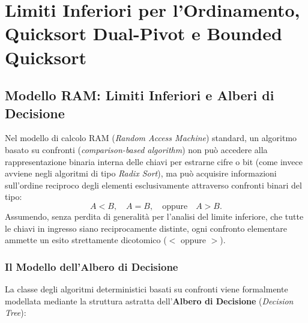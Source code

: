 \chapter{Limiti Inferiori per l'Ordinamento, Quicksort Dual-Pivot e Bounded Quicksort}
\label{cha:lecture-five}

\FloatBarrier
\section{Modello RAM: Limiti Inferiori e Alberi di Decisione}
\label{sec:ram-lower-bounds}

Nel modello di calcolo RAM (\textit{Random Access Machine}) standard, un algoritmo basato su confronti (\textit{comparison-based algorithm}) non può accedere alla rappresentazione binaria interna delle chiavi per estrarne cifre o bit (come invece avviene negli algoritmi di tipo \textit{Radix Sort}), ma può acquisire informazioni sull'ordine reciproco degli elementi esclusivamente attraverso confronti binari del tipo:
\begin{equation}
  A < B, \quad A = B, \quad \text{oppure} \quad A > B.
\end{equation}
Assumendo, senza perdita di generalità per l'analisi del limite inferiore, che tutte le chiavi in ingresso siano reciprocamente distinte, ogni confronto elementare ammette un esito strettamente dicotomico ($<$ oppure $>$).

\FloatBarrier
\subsection{Il Modello dell'Albero di Decisione}
\label{subsec:decision-tree-model}

La classe degli algoritmi deterministici basati su confronti viene formalmente modellata mediante la struttura astratta dell'\textbf{Albero di Decisione} (\textit{Decision Tree}):

